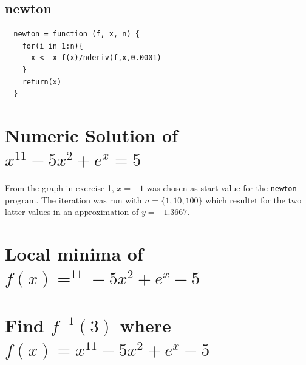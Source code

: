 \documentclass[a4paper,11pt,twoside]{article}
\begin{document}
\subsection{newton}
\begin{lstlisting}
  newton = function (f, x, n) {
    for(i in 1:n){
      x <- x-f(x)/nderiv(f,x,0.0001)
    }
    return(x)
  }
\end{lstlisting}



\section{Numeric Solution of $x^{11}-5x^2+e^x=5$}
From the graph in exercise 1, $x = -1$ was chosen as start value for the \verb+newton+ program.
The iteration was run with $n = \{1,10,100\}$ which resultet for the two latter values in an approximation of $y = -1.3667$.
\section{Local minima of $f(x) =^{11}-5x^2+e^x-5$}
\section{Find $f^{-1}(3)$ where $f(x) = x^{11}-5x^2+e^x-5$}
  
 

\end{document}
